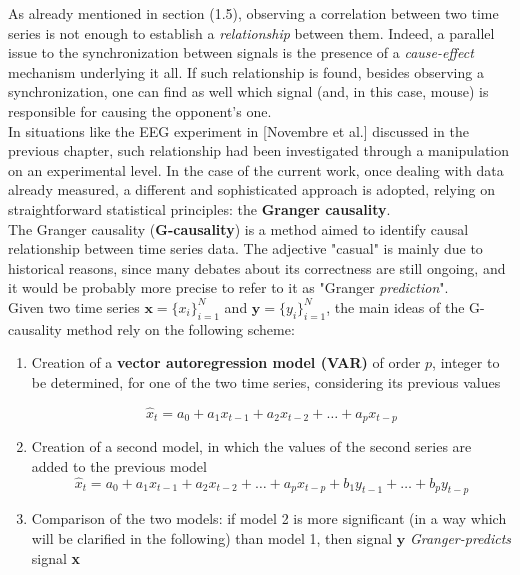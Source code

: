 \documentclass[a4paper]{article}
\begin{document}
As already mentioned in section (1.5), observing a correlation between two time series 
is not enough to establish a \textit{relationship} between them. Indeed, a parallel issue to the synchronization between signals is the presence of a \textit{cause-effect} mechanism underlying it all. If such relationship is found, besides observing a synchronization, one can find as well which signal (and, in this case, mouse) is responsible for causing the opponent's one.\\
In situations like the EEG experiment in [Novembre et al.] discussed in the previous chapter, such relationship had been investigated through a manipulation on an experimental level. In the case of the current work, once dealing with data already measured, a different and sophisticated approach is adopted, relying on straightforward statistical principles: the \textbf{Granger causality}.\\
The Granger causality (\textbf{G-causality}) is a method aimed to identify causal relationship between time series data. The adjective "casual" is mainly due to historical reasons, since many debates about its correctness are still ongoing, and it would be probably more precise to refer to it as "Granger \textit{prediction}".
\\

Given two time series $ \textbf{x} = \{x_i\}_{i=1}^N$ and  $\textbf{y} = \{y_i\}_{i=1}^N$, the main ideas of the G-causality method rely on the following scheme:

\begin{enumerate}
	
	\item Creation of a \textbf{vector autoregression model (VAR)} of order $p$, integer to be determined, for one of the two time series, considering its previous values
	
	\begin{equation}
	\hat{x}_t = a_0 + a_1 x_{t-1} + a_2 x_{t-2} + \dots + a_p x_{t-p}
	\end{equation}
	
	
	\item Creation of a second model, in which the values of the second series are added  to the previous model 
	\begin{equation}
	\hat{x}_t = a_0 + a_1 x_{t-1} + a_2 x_{t-2} + \dots + a_p x_{t-p} + b_1 y_{t-1} + \dots + b_p y_{t-p}
	\end{equation}
	
	
	\item Comparison of the two models: if model 2 is more significant (in a way which will be clarified in the following) than model 1, then signal $\textbf{y}$ \textit{Granger-predicts} signal \textbf{x} 
	
\end{enumerate}
\end{document}
